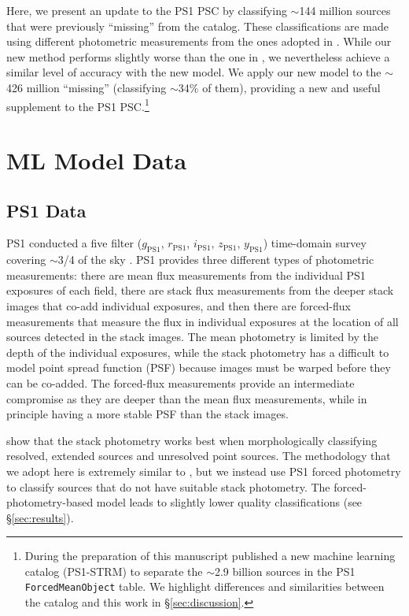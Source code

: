 \documentclass[twocolumn]{aastex63}
\begin{document}
Here, we present an update to the PS1 PSC by classifying $\sim$144 million
sources that were previously ``missing'' from the catalog. These
classifications are made using different photometric measurements from the
ones adopted in \citet{Tachibana18}. While our new method performs slightly
worse than the one in \citet{Tachibana18}, we nevertheless achieve a similar
level of accuracy with the new model. We apply our new model to the $\sim$426
million ``missing'' (classifying $\sim$34\% of them), providing a new and
useful supplement to the PS1 PSC.\footnote{During the preparation of this
manuscript \citet{Beck20} published a new machine learning catalog (PS1-STRM)
to separate the $\sim$2.9 billion sources in the PS1 \texttt{ForcedMeanObject}
table. We highlight differences and similarities between the
\citeauthor{Beck20} catalog and this work in \S\ref{sec:discussion}.}

\section{ML Model Data}

\subsection{PS1 Data}

PS1 conducted a five filter ($g_\mathrm{PS1}$, $r_\mathrm{PS1}$,
$i_\mathrm{PS1}$, $z_\mathrm{PS1}$, $y_\mathrm{PS1}$) time-domain survey
covering $\sim$3/4 of the sky \citep{Chambers16}. PS1 provides three different
types of photometric measurements: there are mean flux measurements from the
individual PS1 exposures of each field, there are stack flux measurements from
the deeper stack images that co-add individual exposures, and then there are
forced-flux measurements that measure the flux in individual exposures at the
location of all sources detected in the stack images. The mean photometry is
limited by the depth of the individual exposures, while the stack photometry
has a difficult to model point spread function (PSF) because images must be
warped before they can be co-added. The forced-flux measurements provide an
intermediate compromise as they are deeper than the mean flux measurements,
while in principle having a more stable PSF than the stack images.

\citet{Tachibana18} show that the stack photometry works best when
morphologically classifying resolved, extended sources and unresolved point
sources. The methodology that we adopt here is extremely similar to
\citet{Tachibana18}, but we instead use PS1 forced photometry to classify
sources that do not have suitable stack photometry. The
forced-photometry-based model leads to slightly lower quality classifications
(see \S\ref{sec:results}).
\end{document}
